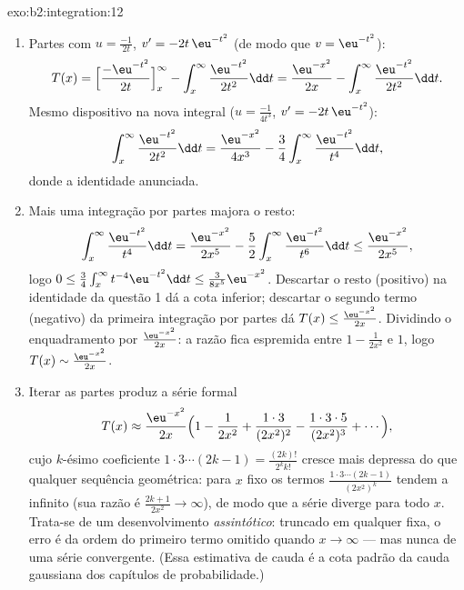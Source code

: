 \begin{solution}{exo:b2:integration:12}
\begin{enumerate}
  \item Partes com $u = \frac{-1}{2t}$, $v' = -2t\,\eu^{-t^2}$
        (de modo que $v = \eu^{-t^2}$):
        \[
        T(x) = \Bigl[\frac{-\eu^{-t^2}}{2t}\Bigr]_x^\infty
        - \int_x^\infty \frac{\eu^{-t^2}}{2t^2}\dd t
        = \frac{\eu^{-x^2}}{2x}
        - \int_x^\infty \frac{\eu^{-t^2}}{2t^2}\dd t .
        \]
        Mesmo dispositivo na nova integral ($u = \frac{-1}{4t^3}$,
        $v' = -2t\,\eu^{-t^2}$):
        \[
        \int_x^\infty \frac{\eu^{-t^2}}{2t^2}\dd t
        = \frac{\eu^{-x^2}}{4x^3}
        - \frac34\int_x^\infty \frac{\eu^{-t^2}}{t^4}\dd t ,
        \]
        donde a identidade anunciada.
  \item Mais uma integração por partes majora o resto:
        \[
        \int_x^\infty \frac{\eu^{-t^2}}{t^4}\dd t
        = \frac{\eu^{-x^2}}{2x^5}
        - \frac52\int_x^\infty\frac{\eu^{-t^2}}{t^6}\dd t
        \leq \frac{\eu^{-x^2}}{2x^5},
        \]
        logo $0 \leq \frac34\int_x^\infty t^{-4}\eu^{-t^2}\dd t
        \leq \frac{3}{8x^5}\eu^{-x^2}$. Descartar o resto (positivo)
        na identidade da questão 1 dá a cota
        inferior; descartar o segundo termo (negativo) da primeira
        integração por partes dá $T(x) \leq \frac{\eu^{-x^2}}{2x}$. Dividindo
        o enquadramento por $\frac{\eu^{-x^2}}{2x}$: a razão fica
        espremida entre $1 - \frac{1}{2x^2}$ e $1$, logo $T(x)
        \sim \frac{\eu^{-x^2}}{2x}$.
  \item Iterar as partes produz a série formal
        \[
        T(x) \approx \frac{\eu^{-x^2}}{2x}\Bigl(1 -
        \frac{1}{2x^2} + \frac{1\cdot3}{(2x^2)^2} -
        \frac{1\cdot3\cdot5}{(2x^2)^3} + \cdots\Bigr),
        \]
        cujo $k$-ésimo coeficiente $1\cdot3\cdots(2k-1) =
        \frac{(2k)!}{2^k k!}$ cresce mais depressa do que qualquer sequência
        geométrica: para $x$ fixo os termos
        $\frac{1\cdot3\cdots(2k-1)}{(2x^2)^k}$ tendem a infinito
        (sua razão é $\frac{2k+1}{2x^2} \to \infty$), de modo que a
        série diverge para todo $x$. Trata-se de um
        desenvolvimento \emph{assintótico}: truncado em qualquer 
        fixa, o erro é da ordem do primeiro termo omitido
        quando $x \to \infty$ --- mas nunca de uma série
        convergente. (Essa estimativa de cauda é a cota padrão da cauda
        gaussiana dos capítulos de probabilidade.)
\end{enumerate}
\end{solution}

